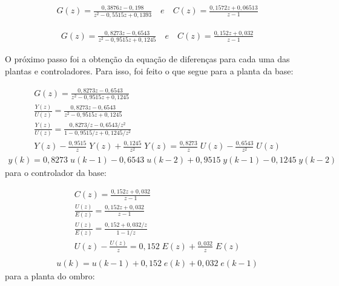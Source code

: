 \begin{equation}
  \begin{gathered}
    G(z) = \frac{0,3876z - 0,198}{z^2 - 0,5515z + 0,1393} \quad e \quad C(z) = \frac{0,1572z + 0,06513}{z - 1}
  \end{gathered}
  \label{eq:shoulder_discrete}
\end{equation}

\begin{equation}
  \begin{gathered}
   G(z) = \frac{0,8273z - 0,6543}{z^2 - 0,9515z + 0,1245} \quad e \quad C(z) = \frac{0,152z + 0,032}{z - 1}
  \end{gathered}
  \label{eq:forearm_discrete}
\end{equation}

O próximo passo foi a obtenção da equação de diferenças para cada uma das plantas e
controladores. Para isso, foi feito o que segue para a planta da base:

\begin{equation*}
  \begin{gathered}
    G(z) = \frac{0,8273z - 0,6543}{z^2 - 0,9515z + 0,1245} \\[0.5cm]
    \frac{Y(z)}{U(z)} = \frac{0,8273z - 0,6543}{z^2 - 0,9515z + 0,1245}\\[0.5cm]
    \frac{Y(z)}{U(z)} = \frac{0,8273/z - 0,6543/z^2}{1 - 0,9515/z + 0,1245/z^2}\\[0.5cm]
    Y(z) - \frac{0,9515}{z} \;Y(z) + \frac{0,1245}{z^2} \;Y(z) = \frac{0,8273}{z} \;U(z) - \frac{0,6543}{z^2} \;U(z)
  \end{gathered}
  \label{eq:base_plant_diffEqIntro}
\end{equation*}
\begin{equation}
  \begin{gathered}
    y(k) = 0,8273 \;u(k-1) - 0,6543 \;u(k-2) + 0,9515 \;y(k-1) - 0,1245 \;y(k-2)
  \end{gathered}
  \label{eq:base_plant_diffEq}
\end{equation}
para o controlador da base:

\begin{equation*}
  \begin{gathered}
    C(z) = \frac{0,152z + 0,032}{z - 1}\\[0.5cm]
    \frac{U(z)}{E(z)} = \frac{0,152z + 0,032}{z - 1}\\[0.5cm]
    \frac{U(z)}{E(z)} = \frac{0,152 + 0,032/z}{1 - 1/z}\\[0.5cm]
    U(z) - \frac{U(z)}{z} = 0,152\;E(z) + \frac{0,032}{z}\;E(z)\\[0.5cm]
  \end{gathered}
  \label{eq:base_ctrl_diffEqIntro}
\end{equation*}
\begin{equation}
  \begin{gathered}
    u(k) = u(k-1) + 0,152\; e(k) + 0,032 \;e(k-1)
  \end{gathered}
  \label{eq:base_ctrl_diffEq}
\end{equation}
para a planta do ombro:

